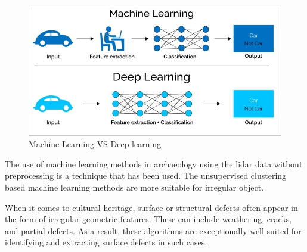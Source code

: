\begin{figure}[H]
\centering
\includegraphics[width=15cm]{images/deepLearningVSmachineLearning.jpeg}
\caption{Machine Learning VS Deep learning\cite{deepLearningVSmachineLearning}}
\end{figure}

The use of machine learning methods in archaeology using the \ac{lidar} data without preprocessing is a technique that has been used. The unsupervised clustering based machine learning methods are more suitable for irregular object\cite{rawLidarjoaofonte}.

When it comes to cultural heritage, surface or structural defects often appear in the form of irregular geometric features. These can include weathering, cracks, and partial defects. As a result, these algorithms are exceptionally well suited for identifying and extracting surface defects in such cases.